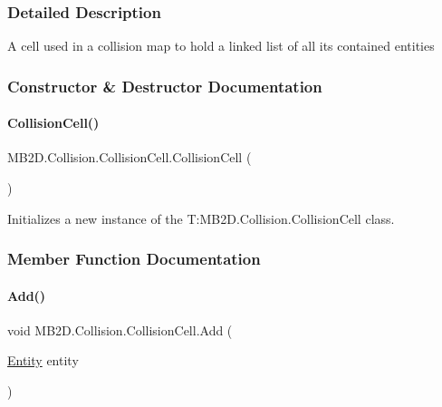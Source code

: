 \subsubsection{Detailed Description}
A cell used in a collision map to hold a linked list of all its contained entities 



\subsubsection{Constructor \& Destructor Documentation}
\hypertarget{class_m_b2_d_1_1_collision_1_1_collision_cell_a2eefdbb1f60eb35c38c45b4a0f4d939d}{}\label{class_m_b2_d_1_1_collision_1_1_collision_cell_a2eefdbb1f60eb35c38c45b4a0f4d939d} 
\paragraph{\texorpdfstring{Collision\+Cell()}{CollisionCell()}}
{\footnotesize\ttfamily M\+B2\+D.\+Collision.\+Collision\+Cell.\+Collision\+Cell (\begin{DoxyParamCaption}{ }\end{DoxyParamCaption})\hspace{0.3cm}{\ttfamily [inline]}}



Initializes a new instance of the T\+:\+M\+B2\+D.\+Collision.\+Collision\+Cell class. 



\subsubsection{Member Function Documentation}
\hypertarget{class_m_b2_d_1_1_collision_1_1_collision_cell_a4fc338d7dbfd7418f5493424c5937213}{}\label{class_m_b2_d_1_1_collision_1_1_collision_cell_a4fc338d7dbfd7418f5493424c5937213} 
\paragraph{\texorpdfstring{Add()}{Add()}}
{\footnotesize\ttfamily void M\+B2\+D.\+Collision.\+Collision\+Cell.\+Add (\begin{DoxyParamCaption}\item[{\hyperlink{class_m_b2_d_1_1_entity_component_1_1_entity}{Entity}}]{entity }\end{DoxyParamCaption})\hspace{0.3cm}{\ttfamily [inline]}}



